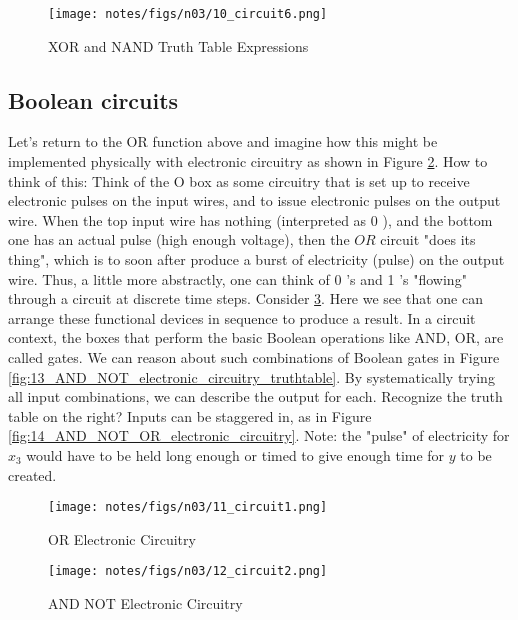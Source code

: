\documentclass[main.tex]{subfiles}
\begin{document}
\begin{figure}
    \centering
    \texttt{[image: notes/figs/n03/10\_circuit6.png]}
    \caption{XOR and NAND Truth Table Expressions}
    \label{fig:10_XOR_NAND_truthtable_expression}
\end{figure}

\subsection{Boolean circuits}

Let's return to the OR function above and imagine how this might be implemented physically with electronic circuitry as shown in Figure \ref{fig:11_OR_electronic_circuitry}. How to think of this: Think of the $\mathrm{O}$ box as some circuitry that is set up to receive electronic pulses on the input wires, and to issue electronic pulses on the output wire. When the top input wire has nothing (interpreted as 0 ), and the bottom one has an actual pulse (high enough voltage), then the $OR$ circuit "does its thing", which is to soon after produce a burst of electricity (pulse) on the output wire. Thus, a little more abstractly, one can think of 0 's and 1 's "flowing" through a circuit at discrete time steps. Consider \ref{fig:12_AND_NOT_electronic_circuitry}. Here we see that one can arrange these functional devices in sequence to produce a result. In a circuit context, the boxes that perform the basic Boolean operations like AND, OR, are called gates. We can reason about such combinations of Boolean gates in Figure \ref{fig:13_AND_NOT_electronic_circuitry_truthtable}. By systematically trying all input combinations, we can describe the output for each. Recognize the truth table on the right? Inputs can be staggered in, as in Figure \ref{fig:14_AND_NOT_OR_electronic_circuitry}. Note: the "pulse" of electricity for $x_3$ would have to be held long enough or timed to give enough time for $y$ to be created.\\

\begin{figure}
    \centering
    \texttt{[image: notes/figs/n03/11\_circuit1.png]}
    \caption{OR Electronic Circuitry}
    \label{fig:11_OR_electronic_circuitry}
\end{figure}

\begin{figure}
    \centering
    \texttt{[image: notes/figs/n03/12\_circuit2.png]}
    \caption{AND NOT Electronic Circuitry}
    \label{fig:12_AND_NOT_electronic_circuitry}
\end{figure}
\end{document}
